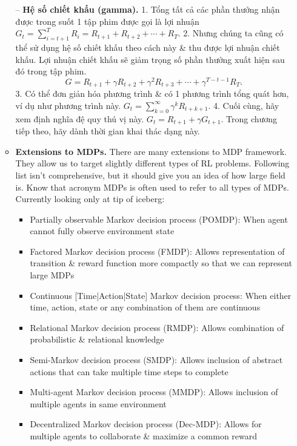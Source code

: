 \documentclass{article}
\begin{document}
\begin{itemize}
\begin{itemize}
        -- {\bf Hệ số chiết khấu (gamma).} 1. Tổng tất cả các phần thưởng nhận được trong suốt 1 tập phim được gọi là lợi nhuận $G_t = \sum_{i=t+1}^T R_i = R_{t+1} + R_{t+2} + \cdots + R_T$. 2. Nhưng chúng ta cũng có thể sử dụng hệ số chiết khấu theo cách này \& thu được lợi nhuận chiết khấu. Lợi nhuận chiết khấu sẽ giảm trọng số phần thưởng xuất hiện sau đó trong tập phim.
        \begin{equation*}
            G = R_{t+1} + \gamma R_{t+2} + \gamma^2R_{t+3} + \cdots + \gamma^{T - t - 1}R_T.
        \end{equation*}
        3. Có thể đơn giản hóa phương trình \& có 1 phương trình tổng quát hơn, ví dụ như phương trình này. $G_t = \sum_{k=0}^\infty \gamma^kR_{t + k + 1}$. 4. Cuối cùng, hãy xem định nghĩa đệ quy thú vị này. $G_t = R_{t+1} + \gamma G_{t+1}$. Trong chương tiếp theo, hãy dành thời gian khai thác dạng này.
        \item {\bf Extensions to MDPs.} There are many extensions to MDP framework. They allow us to target slightly different types of RL problems. Following list isn't comprehensive, but it should give you an idea of how large field is. Know that acronym MDPs is often used to refer to all types of MDPs. Currently looking only at tip of iceberg:
        \begin{itemize}
            \item Partially observable Markov decision process (POMDP): When agent cannot fully observe environment state
            \item Factored Markov decision process (FMDP): Allows representation of transition \& reward function more compactly so that we can represent large MDPs
            \item Continuous [Time|Action|State] Markov decision process: When either time, action, state or any combination of them are continuous
            \item Relational Markov decision process (RMDP): Allows combination of probabilistic \& relational knowledge
            \item Semi-Markov decision process (SMDP): Allows inclusion of abstract actions that can take multiple time steps to complete
            \item Multi-agent Markov decision process (MMDP): Allows inclusion of multiple agents in same environment
            \item Decentralized Markov decision process (Dec-MDP): Allows for multiple agents to collaborate \& maximize a common reward
        \end{itemize}

\end{itemize}
\end{itemize}
\end{document}
